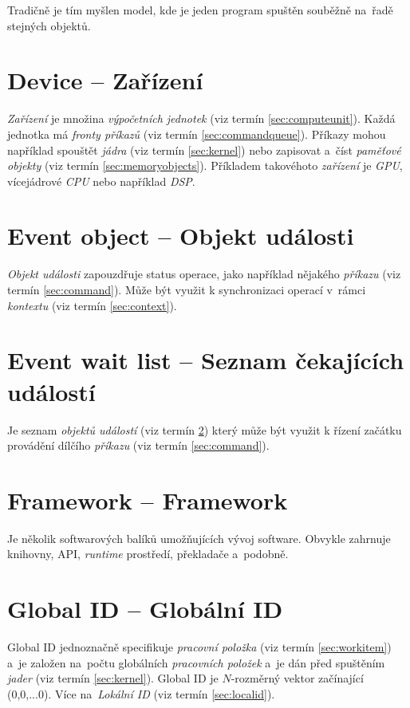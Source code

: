Tradičně je tím myšlen model, kde je jeden
program spuštěn souběžně na~řadě stejných
objektů.

\section{Device -- Zařízení}
\label{sec:device}

\emph{Zařízení} je množina \emph{výpočetních jednotek} (viz termín \ref{sec:computeunit}). 
Každá jednotka má \emph{fronty příkazů} (viz termín \ref{sec:commandqueue}). Příkazy
mohou například spouštět \emph{jádra} (viz termín \ref{sec:kernel}) nebo zapisovat a~číst \emph{paměťové objekty} (viz termín \ref{sec:memoryobjects}). Příkladem takovéhoto \emph{zařízení} je \emph{GPU}, vícejádrové \emph{CPU} nebo například \emph{DSP}.


\section{Event object -- Objekt události}
\label{sec:eventobject}

\emph{Objekt události} zapouzdřuje status operace, jako například nějakého \emph{příkazu} (viz termín \ref{sec:command}). Může být využit
k synchronizaci operací v~rámci \emph{kontextu} (viz termín \ref{sec:context}).

\section{Event wait list -- Seznam čekajících událostí}
\label{sec:eventwaitlist}

Je seznam \emph{objektů událostí} (viz termín \ref{sec:eventobject}) který může být využit k řízení začátku provádění dílčího
\emph{příkazu} (viz termín \ref{sec:command}).

\section{Framework -- Framework}
\label{sec:framework}

Je několik softwarových balíků umožňujících
vývoj software. Obvykle zahrnuje knihovny, API,
\emph{runtime} prostředí, překladače a~podobně.

\section{Global ID -- Globální ID}
\label{sec:globalid}

Global ID jednoznačně specifikuje \emph{pracovní položka} (viz termín \ref{sec:workitem}) a~je založen na~počtu globálních \emph{pracovních položek} a~je dán před spuštěním \emph{jader} (viz termín \ref{sec:kernel}). Global ID je $N$-rozměrný vektor začínající (0,0,...0). Více na~\emph{Lokální ID} (viz termín \ref{sec:localid}).

